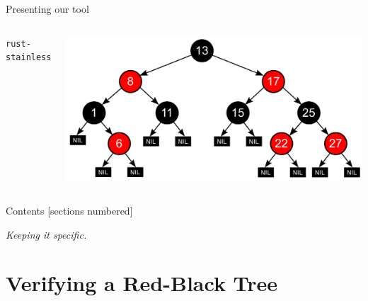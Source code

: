 \begin{frame}{Presenting our tool}
  \begin{columns}
  \centering
  \Large{\texttt{rust-stainless}}

  \centering
  \includegraphics[width=\textwidth]{img/rbtree.png}
\end{columns}
\end{frame}


\begin{frame}{Contents}
  [sections numbered]

  \tableofcontents%

  \textit{Keeping it specific.}
\end{frame}

\section{Verifying a Red-Black Tree}

